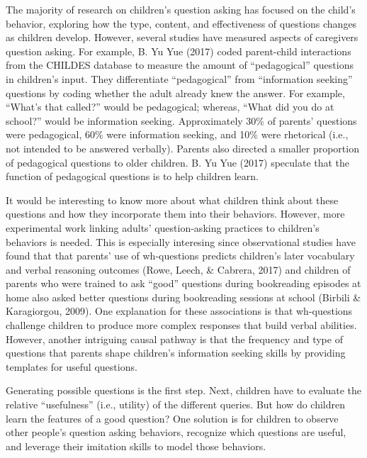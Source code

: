 \documentclass[english,floatsintext,man]{apa6}
\theoremstyle{definition}
\theoremstyle{definition}
\theoremstyle{definition}
\theoremstyle{remark}
\begin{document}
The majority of research on children's question asking has focused on
the child's behavior, exploring how the type, content, and effectiveness
of questions changes as children develop. However, several studies have
measured aspects of caregivers question asking. For example, B. Yu Yue
(2017) coded parent-child interactions from the CHILDES database to
measure the amount of \enquote{pedagogical} questions in children's
input. They differentiate \enquote{pedagogical} from
\enquote{information seeking} questions by coding whether the adult
already knew the answer. For example, \enquote{What's that called?}
would be pedagogical; whereas, \enquote{What did you do at school?}
would be information seeking. Approximately 30\% of parents' questions
were pedagogical, 60\% were information seeking, and 10\% were
rhetorical (i.e., not intended to be answered verbally). Parents also
directed a smaller proportion of pedagogical questions to older
children. B. Yu Yue (2017) speculate that the function of pedagogical
questions is to help children learn.

It would be interesting to know more about what children think about
these questions and how they incorporate them into their behaviors.
However, more experimental work linking adults' question-asking
practices to children's behaviors is needed. This is especially
interesing since observational studies have found that that parents' use
of wh-questions predicts children's later vocabulary and verbal
reasoning outcomes (Rowe, Leech, \& Cabrera, 2017) and children of
parents who were trained to ask \enquote{good} questions during
bookreading episodes at home also asked better questions during
bookreading sessions at school (Birbili \& Karagiorgou, 2009). One
explanation for these associations is that wh-questions challenge
children to produce more complex responses that build verbal abilities.
However, another intriguing causal pathway is that the frequency and
type of questions that parents shape children's information seeking
skills by providing templates for useful questions.

Generating possible questions is the first step. Next, children have to
evaluate the relative \enquote{usefulness} (i.e., utility) of the
different queries. But how do children learn the features of a good
question? One solution is for children to observe other people's
question asking behaviors, recognize which questions are useful, and
leverage their imitation skills to model those behaviors.
\end{document}
